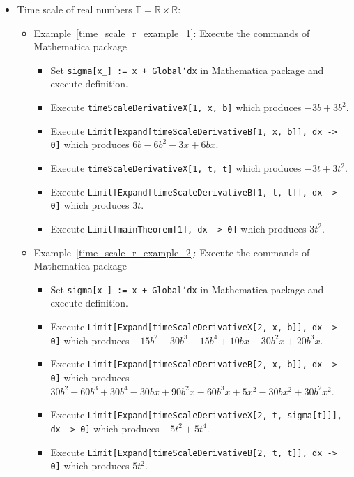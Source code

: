 \begin{itemize}
\begin{itemize}
\begin{itemize}
        \end{itemize}
    \end{itemize}
    \item Time scale of real numbers $\mathbb{T} = \mathbb{R} \times \mathbb{R}$:
    \begin{itemize}
        \item Example~\ref{time_scale_r_example_1}:
        Execute the commands of Mathematica package
        \begin{itemize}
            \item Set \texttt{sigma[x\_] := x + Global`dx} in Mathematica package and execute definition.
            \item Execute \texttt{timeScaleDerivativeX[1, x, b]} which produces $-3 b + 3 b^2$.
            \item Execute \texttt{Limit[Expand[timeScaleDerivativeB[1, x, b]], dx -> 0]}
            which produces $6 b - 6 b^2 - 3 x + 6 b x$.
            \item Execute \texttt{timeScaleDerivativeX[1, t, t]} which produces $-3 t + 3 t^2$.
            \item Execute \texttt{Limit[Expand[timeScaleDerivativeB[1, t, t]], dx -> 0]} which produces $3t$.
            \item Execute \texttt{Limit[mainTheorem[1], dx -> 0]} which produces $3t^2$.
        \end{itemize}
        \item Example~\ref{time_scale_r_example_2}:
        Execute the commands of Mathematica package
        \begin{itemize}
            \item Set \texttt{sigma[x\_] := x + Global`dx} in Mathematica package and execute definition.
            \item Execute \texttt{Limit[Expand[timeScaleDerivativeX[2, x, b]], dx -> 0]}
            which produces $-15 b^2 + 30 b^3 - 15 b^4 + 10 b x - 30 b^2 x + 20 b^3 x$.
            \item Execute \texttt{Limit[Expand[timeScaleDerivativeB[2, x, b]], dx -> 0]}
            which produces $30 b^2 - 60 b^3 + 30 b^4 - 30 b x + 90 b^2 x - 60 b^3 x + 5 x^2 -
            30 b x^2 + 30 b^2 x^2$.
            \item Execute \texttt{Limit[Expand[timeScaleDerivativeX[2, t, sigma[t]]], dx -> 0]} which produces $-5 t^2 + 5 t^4$.
            \item Execute \texttt{Limit[Expand[timeScaleDerivativeB[2, t, t]], dx -> 0]} which produces $5t^2$.

\end{itemize}
\end{itemize}
\end{itemize}
